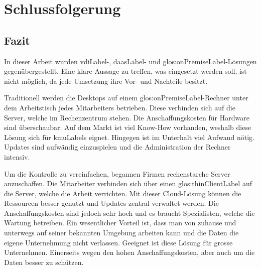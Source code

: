 \chapter{Schlussfolgerung}




\section{Fazit}
In dieser Arbeit wurden \Gls{vdiLabel}-, \Gls{daasLabel}- und \gls{glos:onPremiseLabel}-Lösungen gegenübergestellt. Eine klare Aussage zu treffen, was eingesetzt werden soll, ist nicht möglich, da jede Umsetzung ihre Vor- und Nachteile besitzt.

Traditionell werden die Desktops auf einem \gls{glos:onPremiseLabel}-Rechner unter dem Arbeitstisch jedes Mitarbeiters betrieben. Diese verbinden sich auf die Server, welche im Rechenzentrum stehen. 
Die Anschaffungskosten für Hardware sind überschaubar.
Auf dem Markt ist viel Know-How vorhanden, weshalb diese Lösung sich für \Glspl{kmuLabel} eignet.
Hingegen ist im Unterhalt viel Aufwand nötig. Updates sind aufwändig einzuspielen und die Administration der Rechner intensiv.

Um die Kontrolle zu vereinfachen, begannen Firmen rechenstarche Server anzuschaffen.
Die Mitarbeiter verbinden sich über einen \Gls{glos:thinClientLabel} auf die Server, welche die Arbeit verrichten. Mit dieser Cloud-Lösung können die Ressourcen besser genutzt und Updates zentral verwaltet werden. Die Anschaffungskosten sind jedoch sehr hoch und es braucht Spezialisten, welche die Wartung betreiben.
Ein wesentlicher Vorteil ist, dass man von zuhause und unterwegs auf seiner bekannten Umgebung arbeiten kann und die Daten die eigene Unternehmung nicht verlassen.
Geeignet ist diese Lösung für grosse Unternehmen. Einerseits wegen den hohen Anschaffungskosten, aber auch um die Daten besser zu schützen.

